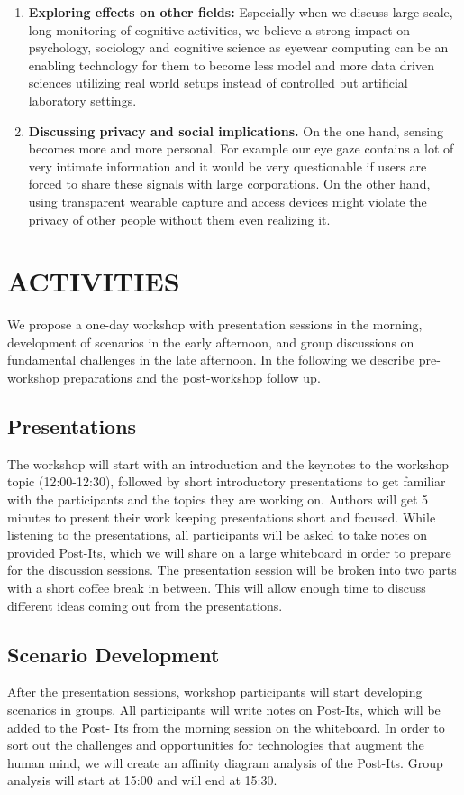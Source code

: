 \documentclass{sigchi-ext}
\begin{document}
\begin{enumerate}
  \item {\bf Exploring effects on other fields:} Especially when we discuss large scale, long monitoring of cognitive activities, we believe a strong impact on psychology, sociology and cognitive science as eyewear computing can be an enabling technology for them to  become less model and more data driven sciences utilizing real world setups instead of controlled but artificial laboratory settings.
  \item {\bf Discussing privacy and social implications.} On the one hand, sensing becomes more and more personal. For example our eye gaze contains a lot of very intimate information and it would be very questionable if users are forced to share these signals with large corporations. On the other hand, using transparent wearable capture and access devices might violate the privacy of other people without them even realizing it.

\end{enumerate}





\section{ACTIVITIES}
We propose a one-day workshop with presentation sessions in the morning, development of scenarios in the early afternoon, and group discussions on fundamental challenges in the late afternoon. In the following we describe pre-workshop preparations and the post-workshop follow up.

\subsection{Presentations}
The workshop will start with an introduction and the keynotes to the workshop topic (12:00-12:30), followed by short introductory presentations to get familiar with the participants and the topics they are working on. Authors will get 5 minutes to present their work keeping presentations short and focused. While listening to the presentations, all participants will be asked to take notes on provided Post-Its, which we will share on a large whiteboard in order to prepare for the discussion sessions.
The presentation session will be broken into two parts with a short coffee break in between. This will allow enough time to discuss different ideas coming out from the presentations.

\subsection{Scenario Development}
After the presentation sessions, workshop participants will start developing scenarios in groups. All participants will write notes on Post-Its, which will be added to the Post- Its from the morning session on the whiteboard. In order to sort out the challenges and opportunities for technologies that augment the human mind, we will create an affinity diagram analysis of the Post-Its. Group analysis will start at 15:00 and will end at 15:30.
\end{document}

